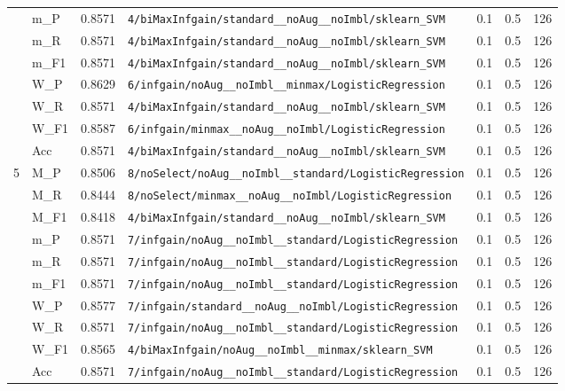 \begin{table}[htbp]
\begin{tabular}{|c|l|c|>{\ttfamily\footnotesize}p{7.2cm}|c|c|c|}
 & m\_P & 0.8571 & \texttt{4/biMaxInfgain/standard\_\_noAug\_\_noImbl/sklearn\_SVM} & 0.1 & 0.5  & 126 \\ 
 & m\_R & 0.8571 & \texttt{4/biMaxInfgain/standard\_\_noAug\_\_noImbl/sklearn\_SVM} & 0.1 & 0.5  & 126 \\ 
 & m\_F1 & 0.8571 & \texttt{4/biMaxInfgain/standard\_\_noAug\_\_noImbl/sklearn\_SVM} & 0.1 & 0.5  & 126 \\ 
 & W\_P & 0.8629 & \texttt{6/infgain/noAug\_\_noImbl\_\_minmax/LogisticRegression} & 0.1 & 0.5  & 126 \\ 
 & W\_R & 0.8571 & \texttt{4/biMaxInfgain/standard\_\_noAug\_\_noImbl/sklearn\_SVM} & 0.1 & 0.5  & 126 \\ 
 & W\_F1 & 0.8587 & \texttt{6/infgain/minmax\_\_noAug\_\_noImbl/LogisticRegression} & 0.1 & 0.5  & 126 \\ 
 & Acc & 0.8571 & \texttt{4/biMaxInfgain/standard\_\_noAug\_\_noImbl/sklearn\_SVM} & 0.1 & 0.5  & 126 \\ 
\hline
\multirow{10}{*}{5} & M\_P & 0.8506 & \texttt{8/noSelect/noAug\_\_noImbl\_\_standard/LogisticRegression} & 0.1 & 0.5  & 126 \\ 
 & M\_R & 0.8444 & \texttt{8/noSelect/minmax\_\_noAug\_\_noImbl/LogisticRegression} & 0.1 & 0.5  & 126 \\ 
 & M\_F1 & 0.8418 & \texttt{4/biMaxInfgain/standard\_\_noAug\_\_noImbl/sklearn\_SVM} & 0.1 & 0.5  & 126 \\ 
 & m\_P & 0.8571 & \texttt{7/infgain/noAug\_\_noImbl\_\_standard/LogisticRegression} & 0.1 & 0.5  & 126 \\ 
 & m\_R & 0.8571 & \texttt{7/infgain/noAug\_\_noImbl\_\_standard/LogisticRegression} & 0.1 & 0.5  & 126 \\ 
 & m\_F1 & 0.8571 & \texttt{7/infgain/noAug\_\_noImbl\_\_standard/LogisticRegression} & 0.1 & 0.5  & 126 \\ 
 & W\_P & 0.8577 & \texttt{7/infgain/standard\_\_noAug\_\_noImbl/LogisticRegression} & 0.1 & 0.5  & 126 \\ 
 & W\_R & 0.8571 & \texttt{7/infgain/noAug\_\_noImbl\_\_standard/LogisticRegression} & 0.1 & 0.5  & 126 \\ 
 & W\_F1 & 0.8565 & \texttt{4/biMaxInfgain/noAug\_\_noImbl\_\_minmax/sklearn\_SVM} & 0.1 & 0.5  & 126 \\ 
 & Acc & 0.8571 & \texttt{7/infgain/noAug\_\_noImbl\_\_standard/LogisticRegression} & 0.1 & 0.5  & 126 \\ 
\hline
\end{tabular}
\end{table}